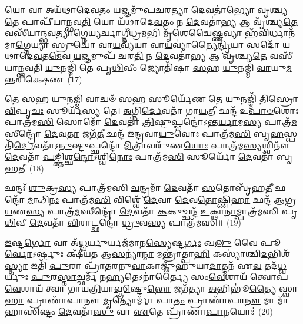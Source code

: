 {\anuvakamend[{𑌵𑍍𑌯𑌾𑌵𑍃᳴𑌤𑍍𑌤𑍍𑌯𑌾 \ul{𑌅}\-𑌭𑌿𑌤𑍋᳴ \ul{𑌵}\-𑌪𑌾𑌂 𑌪𑌞𑍍𑌚᳴ 𑌚}]}%

𑌯𑍋 𑌵𑌾 𑌅𑌯᳴𑌥𑌾𑌦𑍇𑌵𑌤𑌂 \ul{𑌯}\-𑌜𑍍𑌞𑌮𑍁᳴\-\ul{𑌪}\-𑌚\-\ul{𑌰}\-𑌤𑍍𑌯𑌾 \ul{𑌦𑍇}\-𑌵𑌤𑌾॑𑌭𑍍𑌯𑍋 𑌵𑍃𑌶𑍍𑌚𑍍𑌯\-\ul{𑌤𑍇} 𑌪𑌾𑌪𑍀᳴𑌯𑌾𑌨𑍍𑌭𑌵\-\ul{𑌤𑌿} 𑌯𑍋 𑌯᳴𑌥𑌾𑌦𑍇\-\ul{𑌵}\-𑌤𑌂 𑌨 \ul{𑌦𑍇}\-𑌵𑌤𑌾॑\-\ul{𑌭𑍍𑌯} 𑌆 𑌵𑍃᳴𑌶𑍍𑌚𑍍𑌯\-\ul{𑌤𑍇} 𑌵𑌸𑍀᳴𑌯𑌾𑌨𑍍𑌭𑌵𑌤𑍍𑌯𑌾\-\ul{𑌗𑍍𑌨𑍇}\-𑌯𑍍𑌯𑌰𑍍𑌚𑌾𑌗𑍍𑌨𑍀॑𑌧𑍍𑌰\-\ul{𑌮}\-𑌭𑌿 𑌮𑍃᳴𑌶𑍇𑌦𑍍𑌵𑍈\-\ul{𑌷𑍍𑌣}\-𑌵𑍍𑌯𑌾 𑌹᳴\-\ul{𑌵𑌿}\-𑌰𑍍𑌧𑌾𑌨᳴𑌮𑌾\-\ul{𑌗𑍍𑌨𑍇}\-𑌯𑍍𑌯𑌾 𑌸𑍍𑌰𑍁𑌚𑍋᳴ 𑌵𑌾\-\ul{𑌯}\-𑌵𑍍𑌯᳴𑌯𑌾 𑌵𑌾\-\ul{𑌯}\-𑌵𑍍𑌯𑌾॑𑌨𑍍𑌯𑍈\-\ul{𑌨𑍍𑌦𑍍𑌰𑌿}\-𑌯𑌾 𑌸𑌦𑍋᳴ 𑌯𑌥𑌾𑌦𑍇\-\ul{𑌵}\-𑌤\-\ul{𑌮𑍇}\-𑌵 \ul{𑌯}\-𑌜𑍍𑌞𑌮𑍁𑌪᳴ 𑌚𑌰\-\ul{𑌤𑌿} 𑌨 \ul{𑌦𑍇}\-𑌵𑌤𑌾॑\-\ul{𑌭𑍍𑌯} 𑌆 𑌵𑍃᳴𑌶𑍍𑌚𑍍𑌯\-\ul{𑌤𑍇} 𑌵𑌸𑍀᳴𑌯𑌾𑌨𑍍𑌭𑌵𑌤𑌿 \ul{𑌯𑍁}\-𑌨𑌜𑍍𑌮𑌿᳴ 𑌤𑍇 𑌪𑍃\-\ul{𑌥𑌿}\-𑌵𑍀𑌂 𑌜𑍍𑌯𑍋𑌤𑌿᳴𑌷𑌾 \ul{𑌸}\-𑌹 \ul{𑌯𑍁}\-𑌨𑌜𑍍𑌮𑌿᳴ \ul{𑌵𑌾}\-𑌯𑍁\-\ul{𑌮}\-𑌨𑍍𑌤𑌰𑌿᳴𑌕𑍍𑌷𑍇𑌣~(17)

\-\ul{𑌤𑍇} \ul{𑌸}\-𑌹 \ul{𑌯𑍁}\-𑌨\-\ul{𑌜𑍍𑌮𑌿} 𑌵𑌾𑌚𑍞᳴ \ul{𑌸}\-𑌹 𑌸𑍂𑌰𑍍𑌯𑍇᳴𑌣 𑌤𑍇 \ul{𑌯𑍁}\-𑌨𑌜𑍍𑌮𑌿᳴ \ul{𑌤𑌿}\-𑌸𑍍𑌰𑍋 \ul{𑌵𑌿}\-𑌪𑍃\-\ul{𑌚𑌃} 𑌸𑍂𑌰𑍍𑌯᳴𑌸𑍍𑌯 𑌤𑍇। \ul{𑌅}\-𑌗𑍍𑌨𑌿\-\ul{𑌰𑍍𑌦𑍇}\-𑌵𑌤𑌾᳴ 𑌗𑌾\-\ul{𑌯}\-𑌤𑍍𑌰𑍀 𑌛𑌨𑍍𑌦᳴ 𑌉\-\ul{𑌪𑌾}\-\-\ul{𑍞}\-𑌶𑍋𑌃 𑌪𑌾𑌤𑍍𑌰᳴𑌮\-\ul{𑌸𑌿} 𑌸𑍋𑌮𑍋᳴ \ul{𑌦𑍇}\-𑌵𑌤𑌾॑ \ul{𑌤𑍍𑌰𑌿}\-𑌷𑍍𑌟𑍁𑌪𑍍𑌛𑌨𑍍𑌦𑍋॑\-𑌽𑌨𑍍𑌤\-\ul{𑌰𑍍𑌯𑌾}\-𑌮\-\ul{𑌸𑍍𑌯} 𑌪𑌾𑌤𑍍𑌰᳴\-\ul{𑌮}\-𑌸𑍀𑌨𑍍𑌦𑍍𑌰𑍋᳴ \ul{𑌦𑍇}\-𑌵\-\ul{𑌤𑌾} 𑌜𑌗᳴\-\ul{𑌤𑍀} 𑌛𑌨𑍍𑌦᳴ 𑌇𑌨𑍍𑌦𑍍𑌰𑌵𑌾\-\ul{𑌯𑍁}\-𑌵𑍋𑌃 𑌪𑌾𑌤𑍍𑌰᳴𑌮\-\ul{𑌸𑌿} 𑌬𑍃\-\ul{𑌹}\-𑌸𑍍𑌪𑌤𑌿᳴\-\ul{𑌰𑍍𑌦𑍇}\-𑌵𑌤𑌾᳴\-𑌽\-\ul{𑌨𑍁}\-𑌷𑍍𑌟𑍁𑌪𑍍𑌛𑌨𑍍𑌦𑍋᳴ \ul{𑌮𑌿}\-𑌤𑍍𑌰𑌾𑌵𑌰𑍁᳴𑌣\-\ul{𑌯𑍋𑌃} 𑌪𑌾𑌤𑍍𑌰᳴𑌮\-\ul{𑌸𑍍𑌯}\-𑌶𑍍𑌵𑌿𑌨𑍗᳴ \ul{𑌦𑍇}\-𑌵𑌤𑌾᳴ \ul{𑌪}\-𑌙𑍍𑌕𑍍𑌤𑌿𑌶𑍍𑌛\-\ul{𑌨𑍍𑌦𑍋}\-\-𑌽𑌶𑍍𑌵𑌿\-\ul{𑌨𑍋𑌃} 𑌪𑌾𑌤𑍍𑌰᳴𑌮\-\ul{𑌸𑌿} 𑌸𑍂𑌰𑍍𑌯𑍋᳴ \ul{𑌦𑍇}\-𑌵𑌤𑌾᳴ 𑌬𑍃\-\ul{𑌹}\-𑌤𑍀~(18)

𑌛𑌨𑍍𑌦𑌃᳴ \ul{𑌶𑍁}\-𑌕𑍍𑌰\-\ul{𑌸𑍍𑌯} 𑌪𑌾𑌤𑍍𑌰᳴𑌮𑌸𑌿 \ul{𑌚}\-𑌨𑍍𑌦𑍍𑌰𑌮𑌾᳴ \ul{𑌦𑍇}\-𑌵𑌤𑌾᳴ \ul{𑌸}\-𑌤𑍋𑌬𑍃᳴𑌹\-\ul{𑌤𑍀} 𑌛𑌨𑍍𑌦𑍋᳴ \ul{𑌮}\-𑌨𑍍𑌥𑌿\-\ul{𑌨𑌃} 𑌪𑌾𑌤𑍍𑌰᳴𑌮\-\ul{𑌸𑌿} 𑌵𑌿𑌶𑍍𑌵𑍇᳴ \ul{𑌦𑍇}\-𑌵𑌾 \ul{𑌦𑍇}\-𑌵\-\ul{𑌤𑍋}\-𑌷𑍍𑌣𑌿\-\ul{𑌹𑌾} 𑌛𑌨𑍍𑌦᳴ 𑌆𑌗𑍍𑌰\-\ul{𑌯}\-𑌣\-\ul{𑌸𑍍𑌯} 𑌪𑌾𑌤𑍍𑌰᳴\-\ul{𑌮}\-𑌸𑍀𑌨𑍍𑌦𑍍𑌰𑍋᳴ \ul{𑌦𑍇}\-𑌵𑌤𑌾᳴ \ul{𑌕}\-𑌕𑍁𑌚𑍍𑌛𑌨𑍍𑌦᳴ \ul{𑌉}\-𑌕𑍍𑌥𑌾\-\ul{𑌨𑌾}\-𑌮𑍍𑌪𑌾𑌤𑍍𑌰᳴𑌮𑌸𑌿 𑌪𑍃\-\ul{𑌥𑌿}\-𑌵𑍀 \ul{𑌦𑍇}\-𑌵𑌤𑌾᳴ \ul{𑌵𑌿}\-𑌰𑌾𑌟𑍍𑌛𑌨𑍍𑌦𑍋॑ \ul{𑌧𑍍𑌰𑍁}\-𑌵\-\ul{𑌸𑍍𑌯} 𑌪𑌾𑌤𑍍𑌰᳴𑌮𑌸𑌿॥~(19)

{\anuvakamend[{\-\ul{𑌅}\-𑌨𑍍𑌤𑌰𑌿᳴𑌕𑍍𑌷𑍇𑌣 𑌬𑍃\-\ul{𑌹}\-𑌤𑍀 𑌤𑍍𑌰𑌯᳴𑌸𑍍𑌤𑍍𑌰𑌿𑍞𑌶𑌚𑍍𑌚}]}%

\-\ul{𑌇}\-𑌷𑍍𑌟\-\ul{𑌰𑍍𑌗𑍋} 𑌵𑌾 𑌅᳴\-\ul{𑌧𑍍𑌵}\-𑌰𑍍𑌯𑍁𑌰𑍍𑌯𑌜᳴𑌮𑌾𑌨\-\ul{𑌸𑍍𑌯𑍇}\-𑌷𑍍𑌟\-\ul{𑌰𑍍𑌗𑌃} 𑌖\-\ul{𑌲𑍁} 𑌵𑍈 𑌪𑍂\-\ul{𑌰𑍍𑌵𑍋}\-\-𑌽𑌰𑍍𑌷𑍍𑌟𑍁𑌃 𑌕𑍍𑌷𑍀᳴𑌯𑌤 𑌆\-\ul{𑌸}\-𑌨𑍍𑌯𑌾॑\-\ul{𑌨𑍍𑌮𑌾} 𑌮𑌨𑍍𑌤𑍍𑌰𑌾॑𑌤𑍍𑌪𑌾\-\ul{𑌹𑌿} 𑌕𑌸𑍍𑌯𑌾॑𑌶𑍍𑌚𑌿\-\ul{𑌦}\-𑌭𑌿𑌶᳴\-\ul{𑌸𑍍𑌤𑍍𑌯𑌾} 𑌇𑌤𑌿᳴ \ul{𑌪𑍁}\-𑌰𑌾 𑌪𑍍𑌰𑌾᳴𑌤𑌰𑌨𑍁\-\ul{𑌵𑌾}\-𑌕𑌾𑌜𑍍𑌜𑍁᳴𑌹𑍁𑌯𑌾\-\ul{𑌦𑌾}\-𑌤𑍍𑌮𑌨᳴ 𑌏\-\ul{𑌵} 𑌤𑌦᳴\-\ul{𑌧𑍍𑌵}\-𑌰𑍍𑌯𑍁𑌃 \ul{𑌪𑍁}\-𑌰\-\ul{𑌸𑍍𑌤𑌾}\-𑌚𑍍𑌛𑌰𑍍𑌮᳴ 𑌨\-\ul{𑌹𑍍𑌯}\-𑌤𑍇\-𑌽𑌨𑌾॑𑌰𑍍𑌤𑍍𑌯𑍈 𑌸𑌂\-\ul{𑌵𑍇}\-𑌶𑌾𑌯᳴ 𑌤𑍍𑌵𑍋𑌪\-\ul{𑌵𑍇}\-𑌶𑌾𑌯᳴ 𑌤𑍍𑌵𑌾 𑌗𑌾𑌯\-\ul{𑌤𑍍𑌰𑌿}\-𑌯𑌾\-\ul{𑌸𑍍𑌤𑍍𑌰𑌿}\-𑌷𑍍𑌟𑍁\-\ul{𑌭𑍋} 𑌜𑌗᳴𑌤𑍍𑌯𑌾 \ul{𑌅}\-𑌭𑌿𑌭𑍂॑\-\ul{𑌤𑍍𑌯𑍈} 𑌸𑍍𑌵𑌾\-\ul{𑌹𑌾} 𑌪𑍍𑌰𑌾𑌣𑌾᳴𑌪𑌾𑌨𑍗 \ul{𑌮𑍃}\-𑌤𑍍𑌯𑍋𑌰𑍍𑌮𑌾᳴ 𑌪𑌾\-\ul{𑌤𑌂} 𑌪𑍍𑌰𑌾𑌣𑌾᳴𑌪𑌾\-\ul{𑌨𑍗} 𑌮𑌾 𑌮𑌾᳴ 𑌹𑌾𑌸𑌿𑌷𑍍𑌟𑌂 \ul{𑌦𑍇}\-𑌵𑌤𑌾᳴\-\ul{𑌸𑍁} 𑌵𑌾 \ul{𑌏}\-𑌤𑍇 𑌪𑍍𑌰𑌾᳴𑌣𑌾\-\ul{𑌪𑌾}\-𑌨𑌯𑍋𑌃॑~(20)

